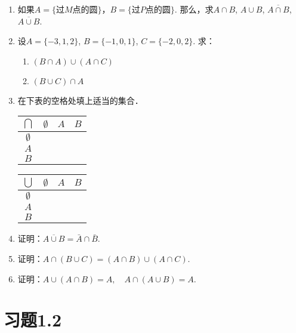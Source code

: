 \begin{ex}
\begin{enumerate}
  \item 如果$A=\{\text{过$M$点的圆}\}$，$B=\{\text{过$P$点的圆}\}$. 
那么，求$A\cap B$, $A\cup B$, $\overline{A\cap B}$, $\overline{A\cup B}$.
\item 设$A=\{-3, 1, 2\}$, $B=\{-1, 0, 1\}$, $C=\{-2, 0, 2\}$. 求：
\begin{multicols}{2}
\begin{enumerate}
  \item $(B\cap A)\cup (A\cap C)$
  \item $(B\cup C) \cap A$
\end{enumerate}
\end{multicols}

\item 在下表的空格处填上适当的集合．
\begin{center}
\begin{tabular}{c|ccc}
  \hline
  $\bigcap $ & $\emptyset$ &$A$&$B$ \\
  \hline
  $\emptyset$ \\
$A$\\
$B$\\
\hline
\end{tabular}\qquad 
\begin{tabular}{c|ccc}
  \hline
  $\bigcup $ & $\emptyset$ &$A$&$B$ \\
  \hline
  $\emptyset$ \\
$A$\\
$B$\\
\hline
\end{tabular}
\end{center}


\item 证明：$\overline{A\cup B}=\bar A\cap \bar B$. 
\item 证明：$A\cap (B\cup C)= (A\cap B)\cup  (A\cap C)$.
\item 证明：$A\cup (A\cap B)=A,\quad A\cap  (A\cup B) =A$.
\end{enumerate}
  
\end{ex}

\section*{习题1.2}


